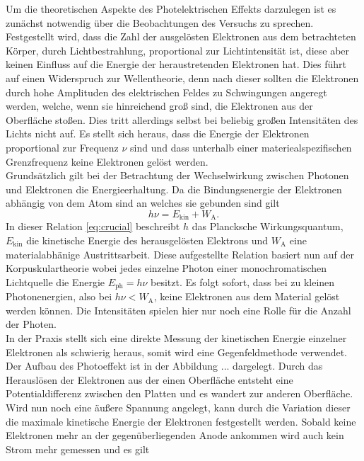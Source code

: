 Um die theoretischen Aspekte des Photelektrischen Effekts darzulegen ist es zunächst notwendig über die Beobachtungen des Versuchs zu sprechen.
Festgestellt wird, dass die Zahl der ausgelösten Elektronen aus dem betrachteten Körper, durch Lichtbestrahlung, proportional zur Lichtintensität ist, diese aber keinen Einfluss auf die Energie der heraustretenden Elektronen hat. Dies 
führt auf einen Widerspruch zur Wellentheorie, denn nach dieser sollten die Elektronen durch hohe Amplituden des elektrischen Feldes zu Schwingungen angeregt werden, welche, wenn sie hinreichend groß sind, die Elektronen aus der Oberfläche stoßen.
Dies tritt allerdings selbst bei beliebig großen Intensitäten des Lichts nicht auf. Es stellt sich heraus, dass die Energie der Elektronen proportional zur Frequenz $\nu$ sind und dass unterhalb einer materiealspezifischen Grenzfrequenz keine Elektronen gelöst werden.
\\
Grundsätzlich gilt bei der Betrachtung der Wechselwirkung zwischen Photonen und Elektronen die Energieerhaltung. Da die Bindungsenergie der Elektronen abhängig von dem Atom sind an welches sie gebunden sind gilt 
\begin{equation}
    \label{eq:crucial}
h \nu = E_{\text{kin}} + W_{\text{A}}.
\end{equation}
In dieser Relation \eqref{eq:crucial} beschreibt $h$ das Plancksche Wirkungsquantum, $E_{\text{kin}}$ die kinetische Energie des herausgelösten Elektrons und $W_{\text{A}}$ eine materialabhänige Austrittsarbeit.
Diese aufgestellte Relation basiert nun auf der Korpuskulartheorie wobei jedes einzelne Photon einer monochromatischen Lichtquelle die Energie $E_{\text{ph}} = h\nu$ besitzt. Es folgt sofort, dass bei zu kleinen Photonenergien, also bei
$h \nu < W_{\text{A}}$, keine Elektronen aus dem Material gelöst werden können. Die Intensitäten spielen hier nur noch eine Rolle für die Anzahl der Photen.
\\
In der Praxis stellt sich eine direkte Messung der kinetischen Energie einzelner Elektronen als schwierig heraus, somit wird eine Gegenfeldmethode verwendet. Der Aufbau des
Photoeffekt ist in der Abbildung ... dargelegt. Durch das Herauslösen der Elektronen aus der einen Oberfläche entsteht eine Potentialdifferenz zwischen den Platten und es wandert zur anderen Oberfläche. Wird nun noch eine äußere Spannung angelegt, kann durch 
die Variation dieser die maximale kinetische Energie der Elektronen festgestellt werden. Sobald keine Elektronen mehr an der gegenüberliegenden Anode ankommen wird auch kein Strom mehr gemessen und es gilt

